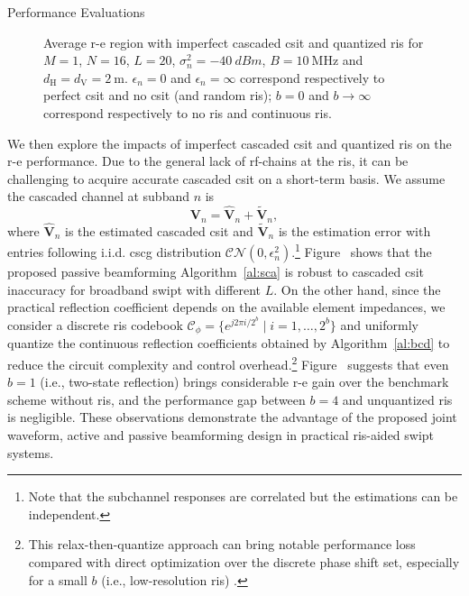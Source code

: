 \begin{section}{Performance Evaluations}
	\begin{figure}[!t]
		\centering
		\caption{Average \gls{r-e} region with imperfect cascaded \gls{csit} and quantized \gls{ris} for $M=1$, $N=16$, $L=20$, $\sigma_n^2=\qty{-40}{dBm}$, $B=\qty{10}{\MHz}$ and $d_{\mathrm{H}}=d_{\mathrm{V}}=\qty{2}{\meter}$. $\epsilon_{n}=0$ and $\epsilon_{n}=\infty$ correspond respectively to perfect \gls{csit} and no \gls{csit} (and random \gls{ris}); $b=0$ and $b \to \infty$ correspond respectively to no \gls{ris} and continuous \gls{ris}.}
	\end{figure}

	We then explore the impacts of imperfect cascaded \gls{csit} and quantized \gls{ris} on the \gls{r-e} performance. Due to the general lack of \gls{rf}-chains at the \gls{ris}, it can be challenging to acquire accurate cascaded \gls{csit} on a short-term basis. We assume the cascaded channel at subband $n$ is
	\begin{equation}
		\boldsymbol{V}_{n} = \hat{\boldsymbol{V}}_{n} + \tilde{\boldsymbol{V}}_{n},
	\end{equation}
	where $\hat{\boldsymbol{V}}_{n}$ is the estimated cascaded \gls{csit} and $\tilde{\boldsymbol{V}}_{n}$ is the estimation error with entries following i.i.d. \gls{cscg} distribution $\mathcal{CN}(0, \epsilon_{n}^2)$.\footnote{Note that the subchannel responses are correlated but the estimations can be independent.} Figure~ shows that the proposed passive beamforming Algorithm~\ref{al:sca} is robust to cascaded \gls{csit} inaccuracy for broadband \gls{swipt} with different $L$. On the other hand, since the practical reflection coefficient depends on the available element impedances, we consider a discrete \gls{ris} codebook $\mathcal{C}_\phi = \{e^{j 2 \pi i / 2^b} \mid i = 1, \dots, 2^b\}$ and uniformly quantize the continuous reflection coefficients obtained by Algorithm~\ref{al:bcd} to reduce the circuit complexity and control overhead.\footnote{This relax-then-quantize approach can bring notable performance loss compared with direct optimization over the discrete phase shift set, especially for a small $b$ (i.e., low-resolution \gls{ris}) \cite{Wu2020c}.} Figure~ suggests that even $b=1$ (i.e., two-state reflection) brings considerable \gls{r-e} gain over the benchmark scheme without \gls{ris}, and the performance gap between $b=4$ and unquantized \gls{ris} is negligible. These observations demonstrate the advantage of the proposed joint waveform, active and passive beamforming design in practical \gls{ris}-aided \gls{swipt} systems.
\end{section}


